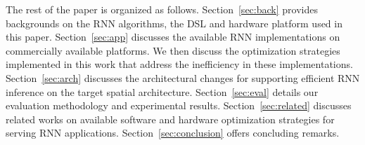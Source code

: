 The rest of the paper is organized as follows.
Section~\ref{sec:back}
  provides backgrounds on the RNN algorithms,
  the DSL and hardware platform used in this paper.
Section~\ref{sec:app} discusses the available RNN implementations
  on commercially available platforms.
  We then discuss the optimization strategies implemented in this work
  that address the inefficiency in these implementations.
Section~\ref{sec:arch} discusses the architectural changes
  for supporting efficient RNN inference on the target spatial architecture.
Section~\ref{sec:eval} details our evaluation methodology and experimental results.
Section~\ref{sec:related} discusses related works on available
  software and hardware optimization strategies for serving RNN applications.
Section~\ref{sec:conclusion} offers concluding remarks.
